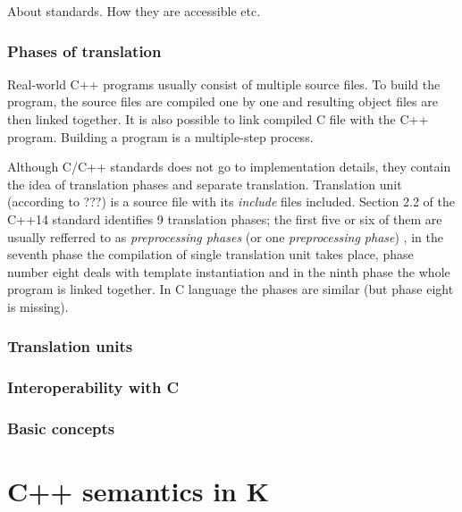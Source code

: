 \documentclass{fithesis3}
\begin{document}
About standards. How they are accessible etc.

\subsection{Phases of translation}
\label{txt:phases-of-translation}
Real-world C++ programs usually consist of multiple source files. To build the program, the source files are compiled one by one and resulting object files are then linked together. It is also possible to link compiled C file with the C++ program. Building a program is a multiple-step process.


Although C/C++ standards does not go to implementation details, they contain the idea of translation phases and separate translation. Translation unit (according to ???) is a source file with its \textit{include} files included. Section 2.2 of the C++14 standard identifies 9 translation phases; the first five or six of them are usually refferred to as \textit{preprocessing phases} (or one \textit{preprocessing phase}) , in the seventh phase the compilation of single translation unit takes place, phase number eight deals with template instantiation and in the ninth phase the whole program is linked together. In C language the phases are similar (but phase eight is missing).

\subsection{Translation units}

\subsection{Interoperability with C}

\subsection{Basic concepts}


\chapter{C++ semantics in K}
\end{document}

